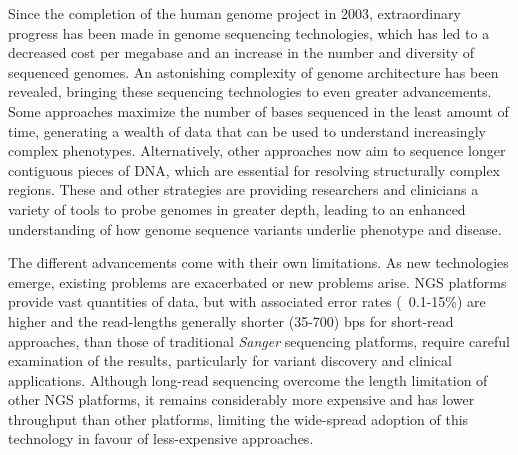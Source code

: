 Since the completion of the human genome project in 2003, extraordinary progress has 
been made in genome sequencing technologies, which has led to a decreased cost per megabase 
and an increase in the number and diversity of sequenced genomes. An astonishing complexity of 
genome architecture has been revealed, bringing these sequencing technologies to even greater 
advancements. Some approaches maximize the number of bases sequenced in the least amount 
of time, generating a wealth of data that can be used to understand increasingly complex 
phenotypes. Alternatively, other approaches now aim to sequence longer contiguous pieces of 
DNA, which are essential for resolving structurally complex regions. These and other strategies 
are providing researchers and clinicians a variety of tools to probe genomes in greater depth, 
leading to an enhanced understanding of how genome sequence variants underlie phenotype 
and disease.

The different advancements come with their own limitations.
As new technologies emerge, existing problems are exacerbated or new problems arise.
NGS platforms provide vast quantities of data, but with associated error rates (~0.1-15\%)
are higher and the read-lengths generally shorter (35-700) bps for short-read approaches, 
than those of traditional \textit{Sanger} sequencing platforms, require careful 
examination of the results, particularly for variant discovery and clinical applications.
Although long-read sequencing overcome the length limitation of other NGS platforms,
it remains considerably more expensive and has lower throughput than other platforms,
limiting the wide-spread adoption of this technology in favour of less-expensive approaches.

